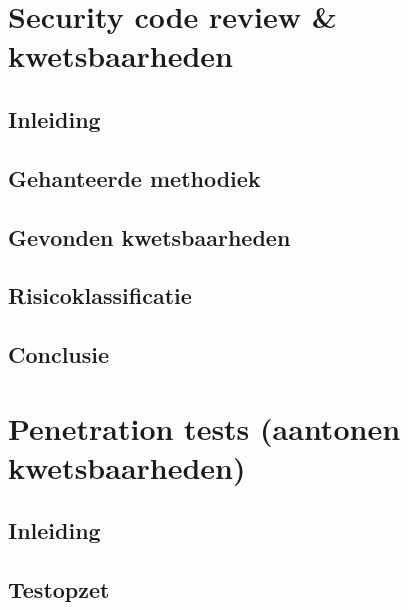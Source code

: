 \documentclass[11pt, a4paper]{report}
\begin{document}
\chapter{Security code review \& kwetsbaarheden}

\section{Inleiding}

\section{Gehanteerde methodiek}

\section{Gevonden kwetsbaarheden}

\section{Risicoklassificatie}

\section{Conclusie}


\chapter{Penetration tests (aantonen kwetsbaarheden)}

\section{Inleiding}

\section{Testopzet}
\end{document}
